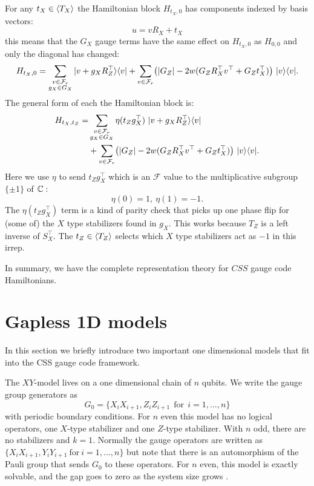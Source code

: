 \documentclass[12pt]{article}
\newcommand{\Field}{\mathcal{F}}
\begin{document}
For any $t_X\in \langle T_X \rangle$ the Hamiltonian block $H_{t_X,0}$
has components indexed by basis vectors:
$$
    u = v R_X + t_X
$$
this means that the $G_X$ gauge terms
have the same effect on $H_{t_X,0}$
as $H_{0,0}$ and only the diagonal has changed:
$$
H_{t_X,0} = \sum_{\substack{v\in\Frd\\g_X\in G_X } }
  \ket{v+g_X  R_Z^\top}\bra{v} 
  + \sum_{v\in\Frd} \bigl(
    |G_Z| - 2w(G_Z R_X^\top v^\top + G_Z t_X^\top)
    \bigr) \ \ket{v}\bra{v}.
$$
The general form of
each the Hamiltonian block is:
\begin{align*}
H_{t_X,t_Z} = &\sum_{\substack{v\in\Frd\\g_X\in G_X } }
    \eta(t_Z g_X^\top)
  \ \ket{v+g_X  R_Z^\top}\bra{v} \\
  &+ \sum_{v\in\Frd} \bigl(
    |G_Z| - 2w(G_Z R_X^\top v^\top + G_Z t_X^\top)
    \bigr) \ \ket{v}\bra{v}.
\end{align*}
Here we use $\eta$ to send 
$t_Zg_X^\top$ which is an $\Field$ value
to the multiplicative subgroup $\{\pm1\}$
of $\mathbb{C}:$
$$
    \eta(0) = 1,\ \eta(1) = -1.
$$
The $\eta(t_Zg_X^\top)$ term
is a kind of parity check that
picks up one phase flip for (some of)
the $X$ type stabilizers found in $g_X.$
This works because $T_Z$ is a left inverse
of $S_X^\top.$
The $t_Z\in\langle T_Z \rangle$ selects which
$X$ type stabilizers act as $-1$ in this irrep.

In summary, we have the complete representation
theory for $CSS$ gauge code Hamiltonians.


%

\section{Gapless 1D models}

In this section we briefly introduce two important
one dimensional models that fit into the CSS gauge code framework.

The $XY$-model 
lives on a one dimensional chain of $n$ qubits.
We write the gauge group generators as
$$
    G_0 = \{ X_i X_{i+1}, Z_i Z_{i+1}\ \ \mbox{for}\ \ i=1,...,n \}
$$
with periodic boundary conditions.
For $n$ even this model has no logical operators, one 
$X$-type stabilizer and one $Z$-type stabilizer.
With $n$ odd, there are no stabilizers and $k=1.$
Normally the gauge operators are written as 
$\{ X_i X_{i+1}, Y_i Y_{i+1} \ \mbox{for}\ i=1,...,n \}$
but note that there is an automorphism of the Pauli group
that sends $G_0$ to these operators.
For $n$ even, this model is exactly solvable,
and the gap goes to zero
as the system size grows \cite{Lieb1961}.
\end{document}
